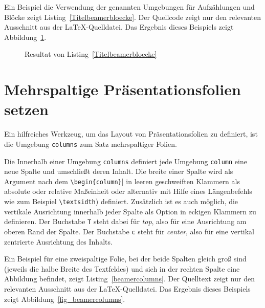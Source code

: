 \documentclass[a4paper,10pt,twoside]{scrbook}
\begin{document}
{Ein Beispiel die Verwendung der genannten Umgebungen für Aufzählungen und Blöcke zeigt Listing~\ref{Titelbeamerbloecke}. Der Quellcode zeigt nur den relevanten Ausschnitt aus der \LaTeX-Quelldatei. Das Ergebnis dieses Beispiels zeigt Abbildung~\ref{fig_Titelbeamerbloecke}.






\begin{figure}[H]
	\caption{Resultat von Listing~\ref{Titelbeamerbloecke}}
	\label{fig_Titelbeamerbloecke}
\end{figure}

\section{Mehrspaltige Präsentationsfolien setzen}

Ein hilfreiches Werkzeug, um das Layout von Präsentationsfolien zu definiert, ist die Umgebung \verb!columns! zum Satz mehrspaltiger Folien.

Die Innerhalb einer Umgebung \verb|columns| definiert jede Umgebung \verb|column| eine neue Spalte und umschließt deren Inhalt. 
Die breite einer Spalte wird als Argument nach dem \verb!\begin{column}!| in leeren geschweiften Klammern als absolute oder relative Maßeinheit oder alternativ mit Hilfe eines Längenbefehls wie zum Beispiel \verb|\textsidth|) definiert. Zusätzlich ist es auch möglich, die vertikale Ausrichtung innerhalb jeder Spalte als Option in eckigen Klammern zu definieren. Der Buchstabe \verb|T| steht dabei für \emph{top}, also für eine Ausrichtung am oberen Rand der Spalte. Der Buchstabe \verb|c| steht für \emph{center}, also für eine vertikal zentrierte Ausrichtung des Inhalts. 

Ein Beispiel für eine zweispaltige Folie, bei der beide Spalten gleich groß sind (jeweils die halbe Breite des Textfeldes) und sich in der rechten Spalte eine Abbildung befindet, zeigt Listing~\ref{beamercolumns}. Der Quelltext zeigt nur den relevanten Ausschnitt aus der \LaTeX-Quelldatei. Das Ergebnis dieses Beispiels zeigt Abbildung~\ref{fig_beamercolumns}. 

}
\end{document}
